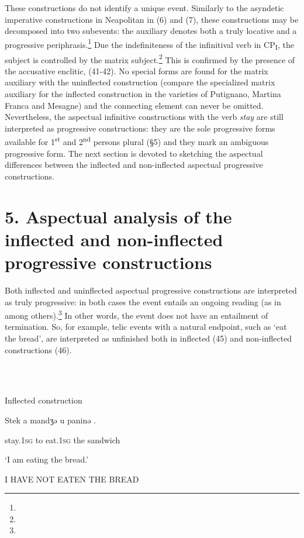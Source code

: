\documentclass[output=paper]{langsci/langscibook}
\begin{document}
These constructions do not identify a unique event. Similarly to the asyndetic imperative constructions in Neapolitan \citep{Ledgeway1997} in (6) and (7), these constructions may be decomposed into two subevents: the auxiliary denotes both a truly locative and a progressive periphrasis.\footnote{} Due the indefiniteness of the infinitival verb in CP\textsubscript{I}, the subject is controlled by the matrix subject.\footnote{} This is confirmed by the presence of the accusative enclitic, (41-42). No special forms are found for the matrix auxiliary with the uninflected construction (compare the specialized matrix auxiliary for the inflected construction in the varieties of Putignano, Martina Franca and Mesagne) and the connecting element can never be omitted. Nevertheless, the aspectual infinitive constructions with the verb \textit{stay} are still interpreted as progressive constructions: they are the sole progressive forms available for 1\textsuperscript{st} and 2\textsuperscript{nd} persons plural (§5) and they mark an ambiguous progressive form. The next section is devoted to sketching the aspectual differences between the inflected and non-inflected aspectual progressive constructions. 

\section{ 5. Aspectual analysis of the inflected and non-inflected progressive constructions}

Both inflected and uninflected aspectual progressive constructions are interpreted as truly progressive: in both cases the event entails an ongoing reading (as in \citealt{Arosio2011} among others).\footnote{} In other words, the event does not have an entailment of termination. So, for example, telic events with a natural endpoint, such as ‘eat the bread’, are interpreted as unfinished both in inflected (45) and non-inflected constructions (46). 

\ea%
    \label{ex:key:45}
    \gll\\
        \\
    \glt
    \z

          Inflected construction

Stek     a  mandʒə   u  paninə  . 

stay.\textsc{1sg} to  eat.\textsc{1sg} the   sandwich 

‘I am eating the bread.’

I HAVE NOT EATEN THE BREAD
\end{document}
